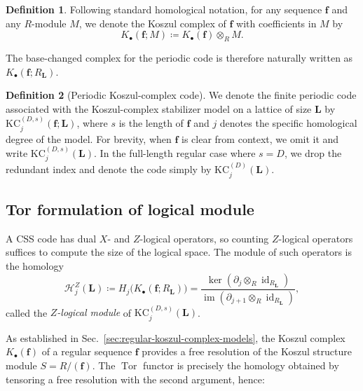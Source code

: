 \documentclass[aps,prx,english,superscriptaddress,twocolumn,tightenlines,showpacs,longbibliography,floatfix,amsfonts]{revtex4-2}
\theoremstyle{remark}
\theoremstyle{definition}
\newtheorem{definition}{Definition}
\begin{document}
\begin{definition}
	Following standard homological notation, for any sequence $\mathbf{f}$ and any $R$-module $M$, we denote the Koszul complex of $\mathbf{f}$ with coefficients in $M$ by
	\begin{equation}
		K_\bullet(\mathbf{f}; M) \coloneqq K_\bullet(\mathbf{f}) \otimes_R M.
	\end{equation}
\end{definition}

The base-changed complex for the periodic code is therefore naturally written as $K_\bullet(\mathbf{f}; R_{\mathbf{L}})$.

\begin{definition}[Periodic Koszul-complex code]
	We denote the finite periodic code associated with the Koszul-complex stabilizer model on a lattice of size $\mathbf{L}$ by $\mathrm{KC}_j^{(D,s)}(\mathbf{f};\mathbf{L})$, where $s$ is the length of $\mathbf{f}$ and $j$ denotes the specific homological degree of the model. For brevity, when $\mathbf{f}$ is clear from context, we omit it and write $\mathrm{KC}_j^{(D,s)}(\mathbf{L})$. In the full-length regular case where $s=D$, we drop the redundant index and denote the code simply by $\mathrm{KC}_j^{(D)}(\mathbf{L})$.
\end{definition}

\subsection{Tor formulation of logical module}

A CSS code has dual $X$- and $Z$-logical operators, so counting $Z$-logical operators suffices to compute the size of the logical space.
The module of such operators is the homology
\[
\mathcal{H}_j^Z(\mathbf{L})
\coloneqq
H_j\bigl(K_\bullet(\mathbf{f}; R_{\mathbf{L}}) \bigr)
=
\frac{\ker(\partial_j\otimes_R\operatorname{id}_{R_{\mathbf{L}}})}{\operatorname{im}(\partial_{j+1}\otimes_R \operatorname{id}_{R_{\mathbf{L}}})},
\]
called the \emph{$Z$-logical module} of $\mathrm{KC}_j^{(D,s)}(\mathbf{L})$.

As established in Sec.~\ref{sec:regular-koszul-complex-models}, the Koszul complex $K_\bullet(\mathbf{f})$ of a regular sequence $\mathbf{f}$ provides a free resolution of the Koszul structure module $S = R/(\mathbf{f})$.
The $\operatorname{Tor}$ functor is precisely the homology obtained by tensoring a free resolution with the second argument, hence:
\end{document}
